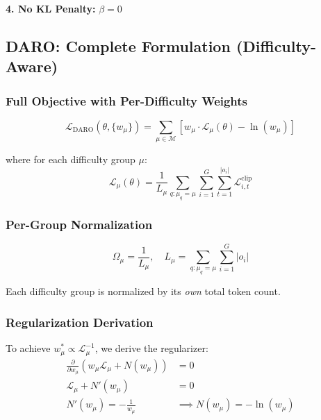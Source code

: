 \documentclass[11pt,a4paper]{article}
\begin{document}
\textbf{4. No KL Penalty:} $\beta = 0$

\subsection{DARO: Complete Formulation (Difficulty-Aware)}

\subsubsection{Full Objective with Per-Difficulty Weights}

\begin{equation}
\mathcal{L}_{\text{DARO}}(\theta, \{w_\mu\}) = \sum_{\mu \in \mathcal{M}} \left[ w_\mu \cdot \mathcal{L}_\mu(\theta) - \ln(w_\mu) \right]
\end{equation}

where for each difficulty group $\mu$:
\begin{equation}
\mathcal{L}_\mu(\theta) = \frac{1}{L_\mu} \sum_{q: \mu_q = \mu} \sum_{i=1}^{G} \sum_{t=1}^{|o_i|} \mathcal{L}_{i,t}^{\text{clip}}
\end{equation}

\subsubsection{Per-Group Normalization}

\begin{equation}
\Omega_\mu = \frac{1}{L_\mu}, \quad L_\mu = \sum_{q: \mu_q = \mu} \sum_{i=1}^{G} |o_i|
\end{equation}

Each difficulty group is normalized by its \emph{own} total token count.

\subsubsection{Regularization Derivation}

To achieve $w_\mu^* \propto \mathcal{L}_\mu^{-1}$, we derive the regularizer:
\begin{align}
\frac{\partial}{\partial w_\mu}(w_\mu \mathcal{L}_\mu + N(w_\mu)) &= 0 \\
\mathcal{L}_\mu + N'(w_\mu) &= 0 \\
N'(w_\mu) = -\frac{1}{w_\mu} &\implies N(w_\mu) = -\ln(w_\mu)
\end{align}
\end{document}
